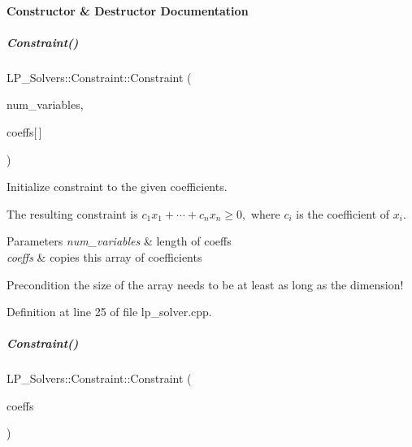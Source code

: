 \paragraph{Constructor \& Destructor Documentation}
\mbox{\label{group___c_l_s_solvers_a461ed6a3396f874d12b2aec6996180d9}} 
\subparagraph{\texorpdfstring{Constraint()}{Constraint()}\hspace{0.1cm}{\footnotesize\ttfamily [1/2]}}
{\footnotesize\ttfamily L\+P\+\_\+\+Solvers\+::\+Constraint\+::\+Constraint (\begin{DoxyParamCaption}\item[{N\+V\+A\+R\+\_\+\+T\+Y\+PE}]{num\+\_\+variables,  }\item[{C\+O\+N\+S\+T\+R\+\_\+\+T\+Y\+PE}]{coeffs\mbox{[}$\,$\mbox{]} }\end{DoxyParamCaption})}



Initialize constraint to the given coefficients. 

The resulting constraint is $ c_1x_1 + \cdots + c_nx_n \geq 0, $ where $ c_i $ is the coefficient of $ x_i $. 
\begin{DoxyParams}{Parameters}
{\em num\+\_\+variables} & length of coeffs \\
\hline
{\em coeffs} & copies this array of coefficients \\
\hline
\end{DoxyParams}
\begin{DoxyPrecond}{Precondition}
the size of the array needs to be at least as long as the dimension! 
\end{DoxyPrecond}


Definition at line 25 of file lp\+\_\+solver.\+cpp.

\mbox{\label{group___c_l_s_solvers_abc362e0473a75944d6b8830f6dc33846}} 
\subparagraph{\texorpdfstring{Constraint()}{Constraint()}\hspace{0.1cm}{\footnotesize\ttfamily [2/2]}}
{\footnotesize\ttfamily L\+P\+\_\+\+Solvers\+::\+Constraint\+::\+Constraint (\begin{DoxyParamCaption}\item[{vector$<$ C\+O\+N\+S\+T\+R\+\_\+\+T\+Y\+PE $>$ \&}]{coeffs }\end{DoxyParamCaption})\hspace{0.3cm}{\ttfamily [explicit]}}



